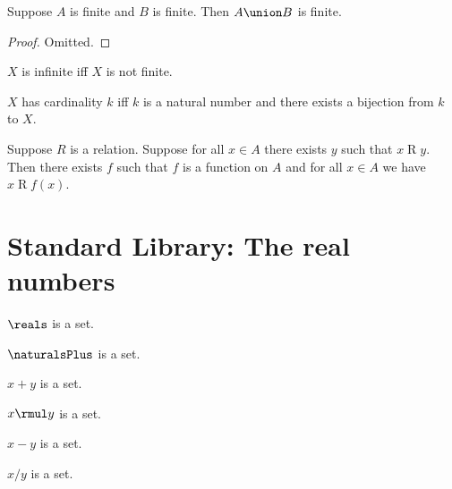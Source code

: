 \begin{lemma} \label{union_of_finite_is_finite}
    Suppose $A$ is finite and $B$ is finite.
    Then $A\union B$ is finite.
\end{lemma}
\begin{proof}
    Omitted.
\end{proof}

\begin{abbreviation}\label{infinite}
    $X$ is infinite iff $X$ is not finite.
\end{abbreviation}

\begin{definition}\label{cardinality}
    $X$ has cardinality $k$ iff $k$ is a natural number and
    there exists a bijection from $k$ to $X$.
\end{definition}

\begin{axiom}\label{axiom_of_choice}
    Suppose $R$ is a relation.
    Suppose for all $x\in A$ there exists $y$ such that $x\mathrel{R} y$.
    Then there exists $f$ such that $f$ is a function on $A$ and for all $x\in A$ we have $x\mathrel{R} f(x)$.
\end{axiom}

\section{Standard Library: The real numbers}

\begin{signature} \label{sig1}
    $\reals$ is a set.
\end{signature}

\begin{signature} \label{sig2}
    $\naturalsPlus$ is a set.
\end{signature}

\begin{signature} \label{sig3}
    $x + y$ is a set.
\end{signature}

\begin{signature} \label{sig4}
    $x \rmul y$ is a set.
\end{signature}

\begin{signature} \label{sig5}
    $x - y$ is a set.
\end{signature}

\begin{signature} \label{sig6}
    $x / y$ is a set.
\end{signature}

